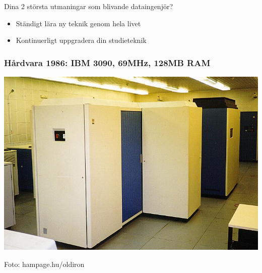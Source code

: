 \documentclass{lecturesimple}
\begin{document}
\begin{Slide}{Dina 2 största utmaningar som blivande dataingenjör?}
  \pause\begin{itemize}
    \item Ständigt lära ny teknik genom hela livet 
    \item Kontinuerligt uppgradera din studieteknik
  \end{itemize}  
\end{Slide}


{
}

\begin{frame}\frametitle{Hårdvara 1986: IBM 3090, 69MHz, 128MB RAM}
\begin{center}
     \includegraphics[width=1.0\textwidth]{../img/ibm3090.jpg}
  
    {\fontsize{5}{5}\selectfont\color{gray}
    Foto: hampage.hu/oldiron
  }
\end{center}
\end{frame}
  
\end{document}
